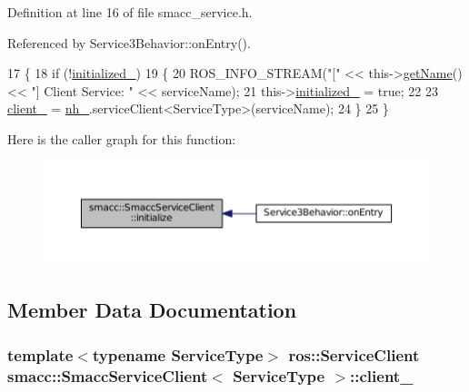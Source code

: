 Definition at line 16 of file smacc\+\_\+service.\+h.



Referenced by Service3\+Behavior\+::on\+Entry().


\begin{DoxyCode}
17     \{
18         \textcolor{keywordflow}{if} (!\hyperlink{classsmacc_1_1SmaccServiceClient_a251b147a783f05d13edb272b85f64982}{initialized\_})
19         \{
20             ROS\_INFO\_STREAM(\textcolor{stringliteral}{"["} << this->\hyperlink{classsmacc_1_1ISmaccComponent_aa314809a7fd3516461e31cc120d0cfe7}{getName}() << \textcolor{stringliteral}{"] Client Service: "} << serviceName);
21             this->\hyperlink{classsmacc_1_1SmaccServiceClient_a251b147a783f05d13edb272b85f64982}{initialized\_} = \textcolor{keyword}{true};
22 
23             \hyperlink{classsmacc_1_1SmaccServiceClient_a6eed795ca67ec50096a9e5695d4281c6}{client\_} = \hyperlink{classsmacc_1_1SmaccServiceClient_a6e5e8b77b4c7137f9c820b09c8f661b5}{nh\_}.serviceClient<ServiceType>(serviceName);
24         \}
25     \}
\end{DoxyCode}


Here is the caller graph for this function\+:
\nopagebreak
\begin{figure}[H]
\begin{center}
\leavevmode
\includegraphics[width=350pt]{classsmacc_1_1SmaccServiceClient_a5be21b63eb7cfe54d9ac7de33c3c0938_icgraph}
\end{center}
\end{figure}




\subsection{Member Data Documentation}
\subsubsection[{\texorpdfstring{client\+\_\+}{client_}}]{\setlength{\rightskip}{0pt plus 5cm}template$<$typename Service\+Type$>$ ros\+::\+Service\+Client {\bf smacc\+::\+Smacc\+Service\+Client}$<$ Service\+Type $>$\+::client\+\_\+\hspace{0.3cm}{\ttfamily [protected]}}\hypertarget{classsmacc_1_1SmaccServiceClient_a6eed795ca67ec50096a9e5695d4281c6}{}\label{classsmacc_1_1SmaccServiceClient_a6eed795ca67ec50096a9e5695d4281c6}


